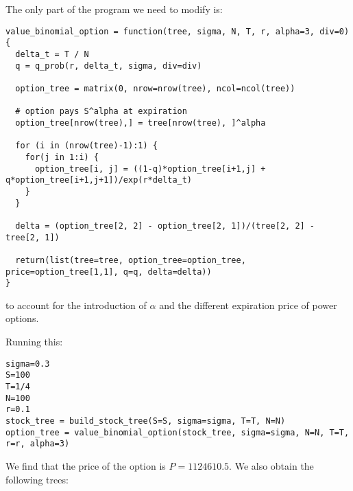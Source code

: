 \documentclass[11pt]{scrartcl}
\begin{document}
\section{}

\subsection{}

The only part of the program we need to modify is:

\begin{lstlisting}
value_binomial_option = function(tree, sigma, N, T, r, alpha=3, div=0) {
  delta_t = T / N
  q = q_prob(r, delta_t, sigma, div=div)
  
  option_tree = matrix(0, nrow=nrow(tree), ncol=ncol(tree))
  
  # option pays S^alpha at expiration
  option_tree[nrow(tree),] = tree[nrow(tree), ]^alpha
  
  for (i in (nrow(tree)-1):1) {
    for(j in 1:i) {
      option_tree[i, j] = ((1-q)*option_tree[i+1,j] + q*option_tree[i+1,j+1])/exp(r*delta_t)
    }
  }
  
  delta = (option_tree[2, 2] - option_tree[2, 1])/(tree[2, 2] - tree[2, 1])
  
  return(list(tree=tree, option_tree=option_tree, price=option_tree[1,1], q=q, delta=delta))
}
\end{lstlisting}

to account for the introduction of $\alpha$ and the different expiration price of power options.

Running this:

\begin{lstlisting}
sigma=0.3
S=100
T=1/4
N=100
r=0.1
stock_tree = build_stock_tree(S=S, sigma=sigma, T=T, N=N)
option_tree = value_binomial_option(stock_tree, sigma=sigma, N=N, T=T, r=r, alpha=3)
\end{lstlisting}

We find that the price of the option is $P=1124610.5$. We also obtain the following trees:
\end{document}
